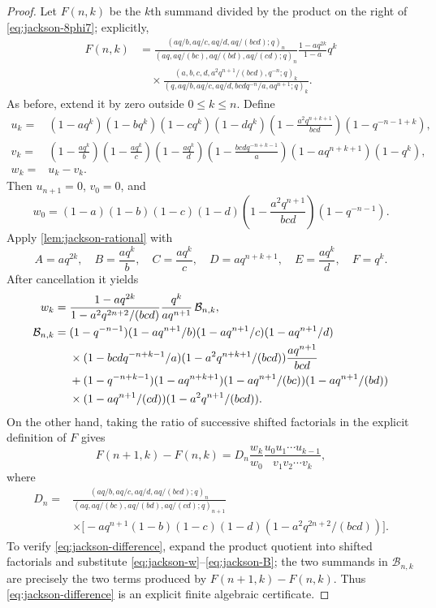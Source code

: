 \documentclass[11pt,oneside]{article}
\theoremstyle{definition}
\begin{document}
\begin{proof}
Let $F(n,k)$ be the $k$th summand divided by the product on the right of \eqref{eq:jackson-8phi7}; explicitly,
\begin{align*}
 F(n,k)&=
 \frac{(aq/b,aq/c,aq/d,aq/(bcd);q)_n}
 {(aq,aq/(bc),aq/(bd),aq/(cd);q)_n}
 \frac{1-aq^{2k}}{1-a}q^k\\
 &\quad\times
 \frac{(a,b,c,d,a^2q^{n+1}/(bcd),q^{-n};q)_k}
 {(q,aq/b,aq/c,aq/d,bcdq^{-n}/a,aq^{n+1};q)_k}.
\end{align*}
As before, extend it by zero outside $0\le k\le n$. Define
\begin{align*}
 u_k={}&(1-aq^k)(1-bq^k)(1-cq^k)(1-dq^k)
 \left(1-\frac{a^2q^{n+k+1}}{bcd}\right)(1-q^{-n-1+k}),\\
 v_k={}&\left(1-\frac{aq^k}{b}\right)
 \left(1-\frac{aq^k}{c}\right)
 \left(1-\frac{aq^k}{d}\right)
 \left(1-\frac{bcdq^{-n+k-1}}a\right)
 (1-aq^{n+k+1})(1-q^k),\\
 w_k={}&u_k-v_k.
\end{align*}
Then $u_{n+1}=0$, $v_0=0$, and
\[
 w_0=(1-a)(1-b)(1-c)(1-d)
 \left(1-\frac{a^2q^{n+1}}{bcd}\right)(1-q^{-n-1}).
\]
Apply \cref{lem:jackson-rational} with
\[
 A=aq^{2k},\quad B=\frac{aq^k}{b},\quad
 C=\frac{aq^k}{c},\quad D=aq^{n+k+1},\quad
 E=\frac{aq^k}{d},\quad F=q^k.
\]
After cancellation it yields
\begin{align}
 w_k={}&\frac{1-aq^{2k}}{1-a^2q^{2n+2}/(bcd)}
 \frac{q^k}{aq^{n+1}}\,\mathcal B_{n,k},\label{eq:jackson-w}\\
\mathcal B_{n,k}={}&
 (1-q^{-n-1})(1-aq^{n+1}/b)(1-aq^{n+1}/c)(1-aq^{n+1}/d)
 \notag\\
&\times(1-bcdq^{-n+k-1}/a)(1-a^2q^{n+k+1}/(bcd))
 \frac{aq^{n+1}}{bcd}\notag\\
&+(1-q^{-n+k-1})(1-aq^{n+k+1})
 (1-aq^{n+1}/(bc))(1-aq^{n+1}/(bd))\notag\\
&\times(1-aq^{n+1}/(cd))(1-a^2q^{n+1}/(bcd)).
\label{eq:jackson-B}
\end{align}
On the other hand, taking the ratio of successive shifted factorials in the explicit definition of $F$ gives
\begin{equation}\label{eq:jackson-difference}
 F(n+1,k)-F(n,k)
 =D_n\frac{w_k}{w_0}
 \frac{u_0u_1\cdots u_{k-1}}{v_1v_2\cdots v_k},
\end{equation}
where
\begin{align*}
D_n={}&
 \frac{(aq/b,aq/c,aq/d,aq/(bcd);q)_n}
 {(aq,aq/(bc),aq/(bd),aq/(cd);q)_{n+1}}\\
&\times\bigl[-aq^{n+1}(1-b)(1-c)(1-d)
 (1-a^2q^{2n+2}/(bcd))\bigr].
\end{align*}
To verify \eqref{eq:jackson-difference}, expand the product quotient into shifted factorials and substitute \eqref{eq:jackson-w}--\eqref{eq:jackson-B}; the two summands in $\mathcal B_{n,k}$ are precisely the two terms produced by $F(n+1,k)-F(n,k)$. Thus \eqref{eq:jackson-difference} is an explicit finite algebraic certificate.


\end{proof}
\end{document}
